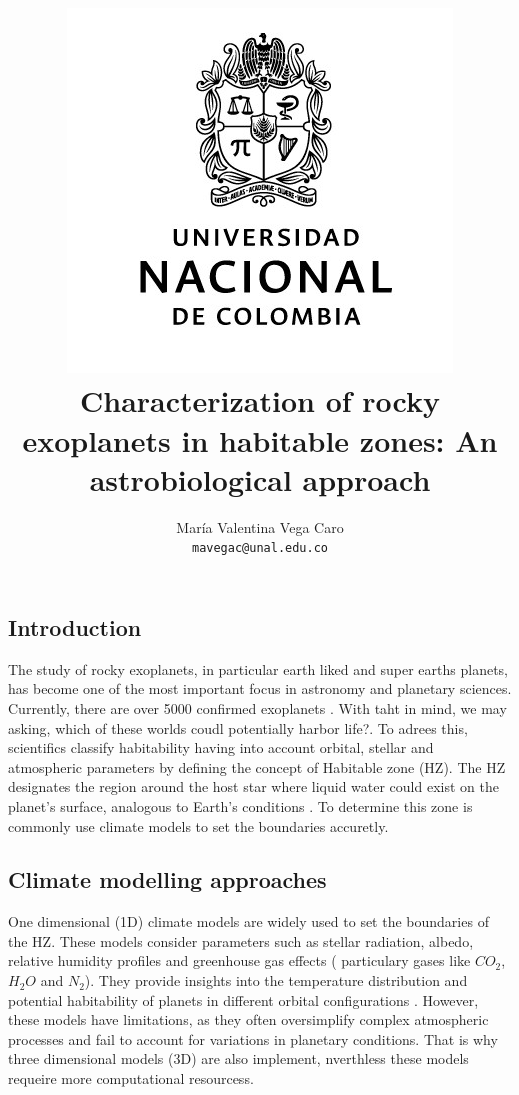 \documentclass{article}
\title{\vspace{-1.5cm}\includegraphics[scale=0.32]{Unal.jpg} \\ \vspace{-0.3cm} \textbf{Characterization of rocky exoplanets in habitable zones: An astrobiological approach}} %
\author{
    María Valentina Vega Caro\\
    
    \texttt{\textup{mavegac@unal.edu.co}}
    }
\affil{
    \textbf{Trabajo de Grado} \\
    \textbf{Universidad Nacional de Colombia} \\ 
    Bogotá D.C., Colombia
    }
\begin{document}
\renewcommand{\listtablename}{Índice de Tablas}
\renewcommand{\tablename}{Tabla}
\sloppy
\maketitle


\noindent\makebox[\linewidth]{\rule{18cm}{0.4pt}}

\vspace{0.3cm}

\begin{abstract} %
    
\end{abstract}
\noindent\makebox[\linewidth]{\rule{18cm}{0.4pt}}

\vspace{0.3cm}
\begin{multicols}{2}
    

\section{Introduction} %
    The study of rocky exoplanets, in particular earth liked and super earths planets, has become one of the most important focus in astronomy and planetary sciences. Currently, there are over 5000 confirmed exoplanets \cite{caltechNASAExoplanet}. With taht in mind, we may asking, which of these worlds coudl potentially harbor life?. To adrees this, scientifics classify habitability having into account orbital, stellar and atmospheric parameters by defining the concept of Habitable zone (HZ). The HZ designates the region around the host star where liquid water could exist on the planet's surface, analogous to Earth's conditions \cite{kasting1993}. To determine this zone is commonly use climate models to set the boundaries accuretly. \\
    \subsection{\textbf{Climate modelling approaches}}
    One dimensional (1D) climate models are widely used to set the boundaries of the HZ. These models consider parameters such as stellar radiation, albedo, relative humidity profiles and greenhouse gas effects ( particulary gases like $CO_{2}$, $H_{2}O$ and $N_{2}$). They provide insights into the temperature distribution and potential habitability of planets in different orbital configurations \cite{kopparapu2019}. However, these models have limitations, as they often oversimplify complex atmospheric processes and fail to account for variations in planetary conditions. That is why three dimensional models (3D) are also implement, nverthless these models requeire more computational resourcess.\\

\end{multicols}
\end{document}
